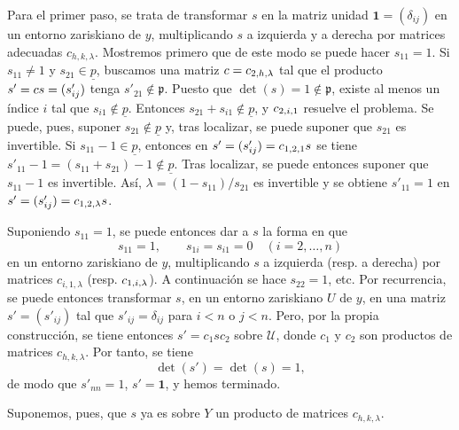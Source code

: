 Para el primer paso, se trata de transformar \(s\) en la matriz unidad
\(\mathbf 1=(\delta_{ij})\) en un entorno zariskiano de \(y\), multiplicando \(s\)
a izquierda y a derecha por matrices adecuadas \(c_{h,k,\lambda}\).
Mostremos primero que de este modo se puede hacer \(s_{11}=1\). Si
\(s_{11}\ne1\) y \(s_{21}\in\underline p\), buscamos una matriz
\(c=\sisi{c_{h,1,\lambda}}{c_{2,h,\lambda}}\) tal que el producto \(\sisi{s'=sc}{s'=cs}=(s'_{ij})\) tenga
\(s'_{21}\notin\mathfrak p\). Puesto que
\(\det(s)=1\notin\mathfrak p\), existe al menos un índice \(i\) tal que
\(s_{i1}\notin\underline p\). Entonces
\(s_{21}+s_{i1}\notin\underline p\), y \(\sisi{c_{i,1,1}}{c_{2,i,1}}\) resuelve el problema.
Se puede, pues, suponer \(s_{21}\notin\underline p\) y, tras localizar, se
puede suponer que \(s_{21}\) es invertible. Si
\(s_{11}-1\in\underline p\), entonces en
\(s'=(s'_{ij})=\sisi{sc_{1,2,1}}{c_{1,2,1}s}\) se tiene
\(s'_{11}-1=(s_{11}+s_{21})-1\notin\underline p\). Tras localizar, se puede
entonces suponer que \(s_{11}-1\) es invertible. Así,
\(\lambda=(1-s_{11})/s_{21}\) es invertible y se obtiene \(s'_{11}=1\) en
\(s'=(s'_{ij})=\sisi{sc_{1,2,\lambda}}{c_{1,2,\lambda}s}\).

Suponiendo \(s_{11}=1\), se puede entonces dar a \(s\) la forma en que
\[
 s_{11}=1,\qquad s_{1i}=s_{i1}=0\quad(i=2,\ldots,n)
\]
en un entorno zariskiano de \(y\), multiplicando \(s\) a izquierda (resp. a
derecha) por matrices \(c_{i,1,\lambda}\) (resp.
\(\sisi{c_{i,1,\lambda}}{c_{1,i,\lambda}}\)). A continuación se hace \(s_{22}=1\), etc. Por
recurrencia, se puede entonces transformar \(s\), en un entorno zariskiano
\(U\) de \(y\), en una matriz \(s'=(s'_{ij})\) tal que
\(s'_{ij}=\delta_{ij}\) para \(i<n\) o \(j<n\). Pero, por la propia
construcción, se tiene entonces \(s'=c_1sc_2\) sobre \(\mathcal U\), donde
\(c_1\) y \(c_2\) son productos de matrices \(c_{h,k,\lambda}\). Por tanto,
se tiene
\[
 \det(s')=\det(s)=1,
\]
de modo que \(s'_{nn}=1\), \(s'=\mathbf 1\), y hemos terminado.


Suponemos, pues, que \(s\) ya es sobre \(Y\) un producto de matrices
\(c_{h,k,\lambda}\).

